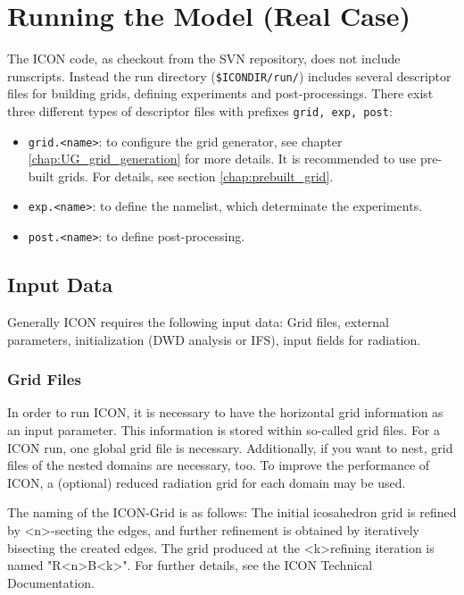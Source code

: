 \section{Running the Model (Real Case)}
\label{chap:UG_running_model}


The ICON code, as checkout from the SVN repository, does not include runscripts. Instead the run directory (\verb+$ICONDIR/run/+) includes several descriptor files for building grids, defining experiments and post-processings. There exist three different types of descriptor files with prefixes \verb+grid, exp, post+:

\begin{itemize}
 \item \verb+grid.<name>+: to configure the grid generator, see chapter \ref{chap:UG_grid_generation} for more details. It is recommended to use pre-built grids. For details, see section \ref{chap:prebuilt_grid}.
 \item \verb+exp.<name>+: to define the namelist, which determinate the experiments.
 \item \verb+post.<name>+: to define post-processing.
\end{itemize}

\subsection{Input Data}

Generally ICON requires the following input data: Grid files, external parameters, initialization (DWD analysis or IFS), input fields for radiation.

\subsubsection{Grid Files}\label{sec:grid_input}

In order to run ICON, it is necessary to have the horizontal grid information as an input parameter. This information is stored within so-called grid files. For a ICON run, one global grid file is necessary. Additionally, if you want to nest, grid files of the nested domains are necessary, too. To improve the performance of ICON, a (optional) reduced radiation grid for each domain may be used. 

The naming of the ICON-Grid is as follows: The initial icosahedron grid is refined by \textless n\textgreater -secting the edges, and further refinement is obtained by iteratively bisecting the created edges. The grid produced at the \textless k\textgreater refining iteration is named "R\textless n\textgreater B\textless k\textgreater". For further details, see the ICON Technical Documentation.

